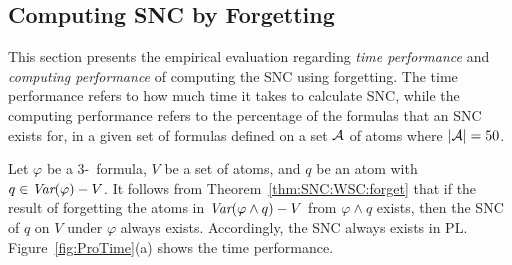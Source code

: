 \documentclass[twoside,11pt]{article}
\begin{document}
	
	\subsection{Computing SNC by Forgetting}
	This section presents the empirical evaluation regarding \emph{time performance} and \emph{computing performance} of computing the SNC using forgetting.
	The time performance refers to how much time  it takes to calculate SNC, while the computing performance refers to the percentage of the formulas that an SNC exists for, in a given set of formulas defined on  a set ${\cal A}$ of atoms where $|{\cal A}|=50$.
	
	Let $\varphi$ be a 3-\CNF\ formula, $V$ be a set of atoms, and $q$ be an atom with $q\in \textit{Var}(\varphi)-V$.
	It follows from Theorem~\ref{thm:SNC:WSC:forget} that if the result of forgetting the atoms in $\textit{Var}(\varphi \wedge q) - V$ from $\varphi \wedge q$ exists, then the SNC of $q$ on $V$ under $\varphi$ always exists.
	Accordingly, the SNC always exists in PL. %
	Figure~\ref{fig:ProTime}(a)  shows the time performance.
	
	
	
	
	\begin{figure*}[!htb]
		\centering
		\caption{The time performance of computing SNC in PL.}
		\label{fig:ProTime}
	\end{figure*}
	
\end{document}
